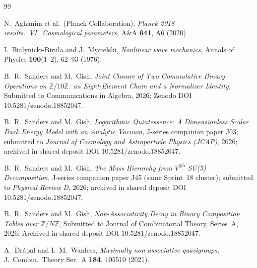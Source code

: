 \documentclass[11pt,reqno]{amsart}
\theoremstyle{plain}
\theoremstyle{definition}
\theoremstyle{remark}
\begin{document}
\begin{thebibliography}{99}

N.~Aghanim et al.\ (Planck Collaboration),
\emph{Planck 2018 results.\ VI.\ Cosmological parameters},
A\&A \textbf{641}, A6 (2020).

I.~Bialynicki-Birula and J.~Mycielski,
\emph{Nonlinear wave mechanics},
Annals of Physics \textbf{100}(1--2), 62--93 (1976).

B.~R.~Sanders and M.~Gish,
\emph{Joint Closure of Two Commutative Binary Operations on
$\mathbb{Z}/10\mathbb{Z}$: an Eight-Element Chain and a
Normalizer Identity},
Submitted to Communications in Algebra, 2026;
Zenodo DOI 10.5281/zenodo.18852047.

B.~R.~Sanders and M.~Gish,
\emph{Logarithmic Quintessence: A Dimensionless Scalar Dark
Energy Model with an Analytic Vacuum},
J-series companion paper J03; submitted to
\emph{Journal of Cosmology and Astroparticle Physics (JCAP)},
2026; archived in shared deposit DOI 10.5281/zenodo.18852047.

B.~R.~Sanders and M.~Gish,
\emph{The Mass Hierarchy from $V^{\otimes 5}$ SU(5) Decomposition},
J-series companion paper J45 (same Sprint~18 cluster);
submitted to \emph{Physical Review D}, 2026;
archived in shared deposit DOI 10.5281/zenodo.18852047.

B.~R.~Sanders and M.~Gish,
\emph{Non-Associativity Decay in Binary Composition Tables over
$\mathbb{Z}/N\mathbb{Z}$},
Submitted to Journal of Combinatorial Theory, Series~A, 2026;
Archived in shared deposit DOI 10.5281/zenodo.18852047.

A.~Dr\'apal and I.~M.~Wanless,
\emph{Maximally non-associative quasigroups},
J.\ Combin.\ Theory Ser.\ A \textbf{184}, 105510 (2021).


\end{thebibliography}
\end{document}
